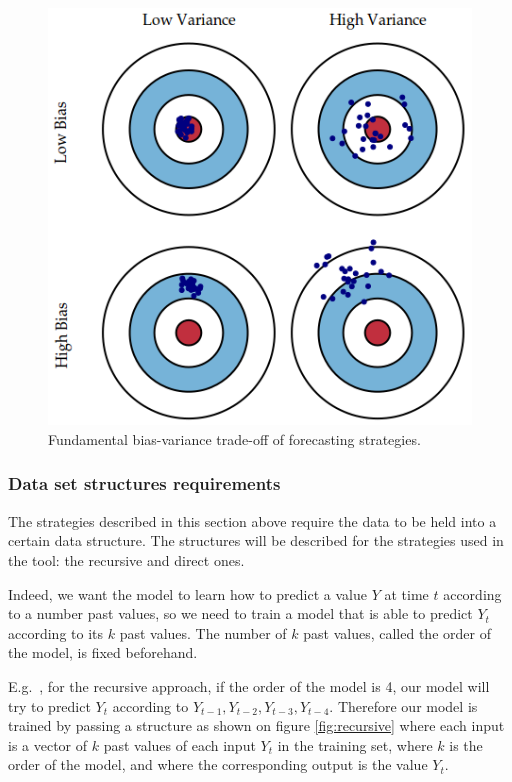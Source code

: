 \documentclass[11pt,a4paper,oneside]{book}
\begin{document}
\begin{figure}[!h]
  \centering
    \includegraphics[scale=0.5]{img/bias-variance.png}
  \caption{Fundamental bias-variance trade-off of forecasting strategies.}
  \label{fig:biasvariance}
\end{figure}



\subsubsection{Data set structures requirements}

The strategies described in this section above require the data to be held into a certain data structure. The structures will be described for the strategies used in the tool: the recursive and direct ones. 

Indeed, we want the model to learn how to predict a value $Y$ at time $t$ according to a number past values, so we need to train a model that is able to predict $Y_t$ according to its $k$ past values. The number of $k$ past values, called the order of the model, is fixed beforehand.  

E.g.\ , for the recursive approach, if the order of the model is 4, our model will try to predict $Y_t$ according to  $Y_{t-1}, Y_{t-2}, Y_{t-3}, Y_{t-4}$. Therefore our model is trained by passing a structure as shown on figure \ref{fig:recursive} where each input is a vector of $k$ past values of each input $Y_t$ in the training set, where $k$ is the order of the model, and where the corresponding output is the value $Y_t$. 
 
\end{document}
